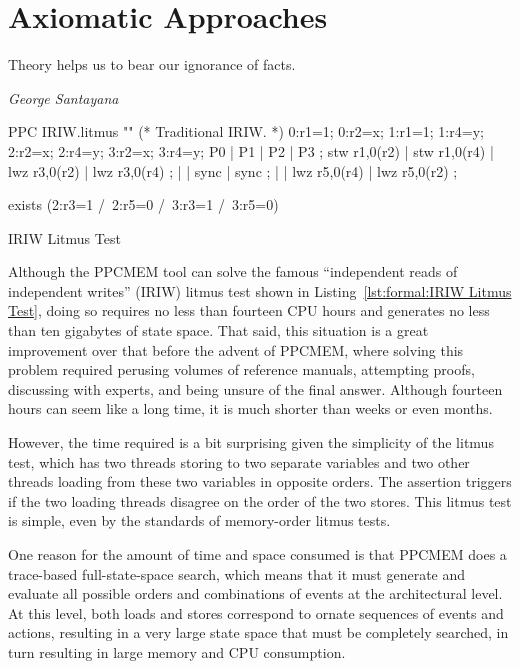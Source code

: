 
\section{Axiomatic Approaches}
\label{sec:formal:Axiomatic Approaches}
%
\epigraph{Theory helps us to bear our ignorance of facts.}
	{\emph{George Santayana}}

\begin{listing}[tb]
\begin{linelabel}
\begin{VerbatimL}[commandchars=\%\@\$]
PPC IRIW.litmus
""
(* Traditional IRIW. *)
{
0:r1=1; 0:r2=x;
1:r1=1;         1:r4=y;
        2:r2=x; 2:r4=y;
        3:r2=x; 3:r4=y;
}
P0           | P1           | P2           | P3           ;
stw r1,0(r2) | stw r1,0(r4) | lwz r3,0(r2) | lwz r3,0(r4) ;
             |              | sync         | sync         ;
             |              | lwz r5,0(r4) | lwz r5,0(r2) ;

exists
(2:r3=1 /\ 2:r5=0 /\ 3:r3=1 /\ 3:r5=0)
\end{VerbatimL}
\end{linelabel}
\caption{IRIW Litmus Test}
\label{lst:formal:IRIW Litmus Test}
\end{listing}

Although the PPCMEM tool can solve the famous ``independent reads of
independent writes'' (IRIW) litmus test shown in
Listing~\ref{lst:formal:IRIW Litmus Test}, doing so requires no less than
fourteen CPU hours and generates no less than ten gigabytes of state space.
That said, this situation is a great improvement over that before the advent
of PPCMEM, where solving this problem required perusing volumes of
reference manuals, attempting proofs, discussing with experts, and
being unsure of the final answer.
Although fourteen hours can seem like a long time, it is much shorter
than weeks or even months.

However, the time required is a bit surprising given the simplicity
of the litmus test, which has two threads storing to two separate variables
and two other threads loading from these two variables in opposite
orders.
The assertion triggers if the two loading threads disagree on the order
of the two stores.
This litmus test is simple, even by the standards of memory-order litmus
tests.

One reason for the amount of time and space consumed is that PPCMEM does
a trace-based full-state-space search, which means that it must generate
and evaluate all possible orders and combinations of events at the
architectural level.
At this level, both loads and stores correspond to ornate sequences
of events and actions, resulting in a very large state space that must
be completely searched, in turn resulting in large memory and CPU
consumption.

